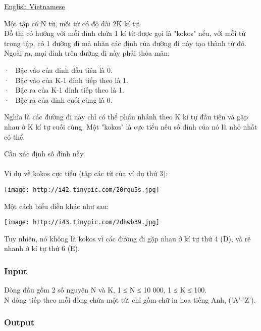 



\href{/problems/show/MKOKOS/en/}{       English      }\href{/problems/show/MKOKOS/vn/}{       Vietnamese      }



   Một tập có N từ, mỗi từ có độ dài 2K kí tự.   
\\   Đồ thị có hướng với mỗi đỉnh chứa 1 kí từ được gọi là "kokos" nếu, với mỗi từ trong tập, có 1 đường đi mà nhãn các định của đường đi này tạo thành từ đó. Ngoài ra, mọi đỉnh trên đường đi này phải thỏa mãn:  

   ·  Bậc vào của đỉnh đầu tiên là 0.   
\\   ·  Bậc vào của K-1 đỉnh tiếp theo là 1.   
\\   ·  Bậc ra của K-1 đỉnh tiếp theo là 1.   
\\   ·  Bậc ra của đỉnh cuối cùng là 0.  

   Nghĩa là các đường đi này chỉ có thể phân nhánh theo K kí tự đầu tiên và gặp nhau ở K kí tự cuối cùng. Một "kokos" là cực tiểu nếu số đỉnh của nó là nhỏ nhất có thể.  

   Cần xác định số đỉnh này.   
\\
\\   Ví dụ về kokos cực tiểu (tập các từ của ví dụ thứ 3):  


\texttt{[image: http://i42.tinypic.com/20rqu5s.jpg]}

   Một cách biểu diễn khác như sau:  


\texttt{[image: http://i43.tinypic.com/2dhwb39.jpg]}

   Tuy nhiên, nó không là kokos vì các đường đi gặp nhau ở kí tự thứ 4 (D), và rẽ nhanh ở kí tự thứ 6 (E).  

\subsubsection{   Input  }

   Dòng đầu gồm 2 số nguyên N và K, 1 ≤ N ≤ 10 000, 1 ≤ K ≤ 100.   
\\   N dòng tiếp theo mỗi dòng chứa một từ, chỉ gồm chữ in hoa tiếng Anh, ('A'-'Z').  

\subsubsection{   Output  }


